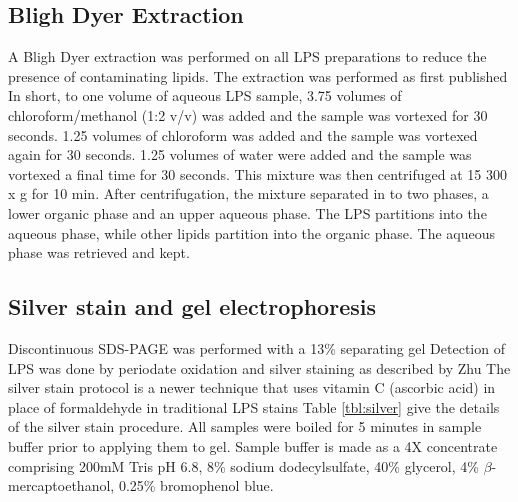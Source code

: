 	\subsection{Bligh Dyer Extraction} %
	\label{sub:bligh_dyer_extraction}
  A Bligh Dyer extraction was performed on all \ac{LPS} preparations to reduce the presence of
  contaminating lipids. The extraction was performed as first published In
  short, to one volume of aqueous \ac{LPS} sample, 3.75 volumes of chloroform/methanol (1:2 v/v) was
  added and the sample was vortexed for 30 seconds. 1.25 volumes of chloroform was added and the
  sample was vortexed again for 30 seconds. 1.25 volumes of water were added and the sample was
  vortexed a final time for 30 seconds. This mixture was then centrifuged at 15 300 x g for 10
  min. After centrifugation, the mixture separated in to two phases, a lower organic phase and an
  upper aqueous phase. The \ac{LPS} partitions into the aqueous phase, while other lipids partition
  into the organic phase. The aqueous phase was retrieved and kept.

	\subsection{Silver stain and gel electrophoresis} %
	\label{sub:gel_electrophoresis}

  Discontinuous \ac{SDS-PAGE} was performed with a 13\% separating gel Detection
  of \ac{LPS} was done by periodate oxidation and silver staining as described by Zhu
  \etal\! The silver stain protocol is a newer technique that uses
  vitamin C (ascorbic acid) in place of formaldehyde in traditional \ac{LPS}
  stains Table \ref{tbl:silver} give the details of the silver stain
  procedure.%
All samples were boiled for 5 minutes in sample buffer prior to applying them to gel. Sample buffer is made as a 4X concentrate comprising 200mM Tris pH 6.8, 8\% sodium dodecylsulfate, 40\% glycerol, 4\% $\beta$-mercaptoethanol, 0.25\% bromophenol blue.


